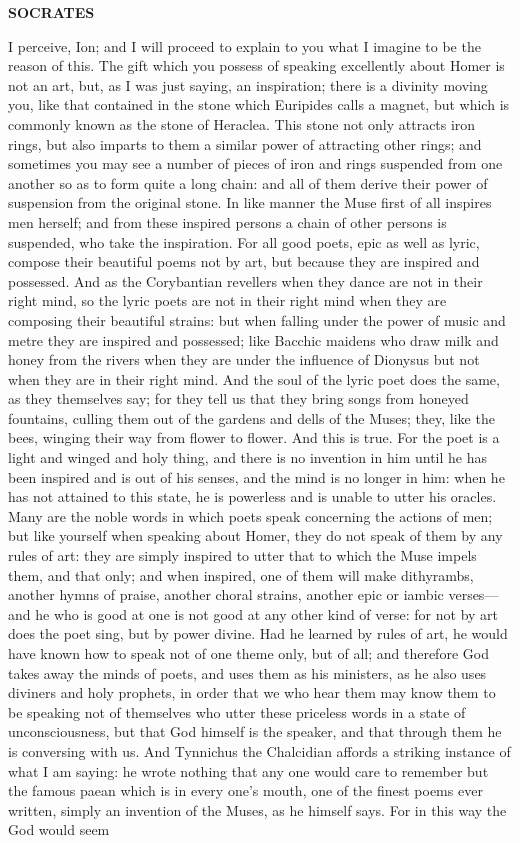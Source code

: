 \documentclass[11pt,letter]{article}
\begin{document}
\par \textbf{SOCRATES}
\par   I perceive, Ion; and I will proceed to explain to you what I imagine to be the reason of this. The gift which you possess of speaking excellently about Homer is not an art, but, as I was just saying, an inspiration; there is a divinity moving you, like that contained in the stone which Euripides calls a magnet, but which is commonly known as the stone of Heraclea. This stone not only attracts iron rings, but also imparts to them a similar power of attracting other rings; and sometimes you may see a number of pieces of iron and rings suspended from one another so as to form quite a long chain:  and all of them derive their power of suspension from the original stone. In like manner the Muse first of all inspires men herself; and from these inspired persons a chain of other persons is suspended, who take the inspiration. For all good poets, epic as well as lyric, compose their beautiful poems not by art, but because they are inspired and possessed. And as the Corybantian revellers when they dance are not in their right mind, so the lyric poets are not in their right mind when they are composing their beautiful strains:  but when falling under the power of music and metre they are inspired and possessed; like Bacchic maidens who draw milk and honey from the rivers when they are under the influence of Dionysus but not when they are in their right mind. And the soul of the lyric poet does the same, as they themselves say; for they tell us that they bring songs from honeyed fountains, culling them out of the gardens and dells of the Muses; they, like the bees, winging their way from flower to flower. And this is true. For the poet is a light and winged and holy thing, and there is no invention in him until he has been inspired and is out of his senses, and the mind is no longer in him:  when he has not attained to this state, he is powerless and is unable to utter his oracles. Many are the noble words in which poets speak concerning the actions of men; but like yourself when speaking about Homer, they do not speak of them by any rules of art:  they are simply inspired to utter that to which the Muse impels them, and that only; and when inspired, one of them will make dithyrambs, another hymns of praise, another choral strains, another epic or iambic verses—and he who is good at one is not good at any other kind of verse:  for not by art does the poet sing, but by power divine. Had he learned by rules of art, he would have known how to speak not of one theme only, but of all; and therefore God takes away the minds of poets, and uses them as his ministers, as he also uses diviners and holy prophets, in order that we who hear them may know them to be speaking not of themselves who utter these priceless words in a state of unconsciousness, but that God himself is the speaker, and that through them he is conversing with us. And Tynnichus the Chalcidian affords a striking instance of what I am saying:  he wrote nothing that any one would care to remember but the famous paean which is in every one's mouth, one of the finest poems ever written, simply an invention of the Muses, as he himself says. For in this way the God would seem 
\end{document}
